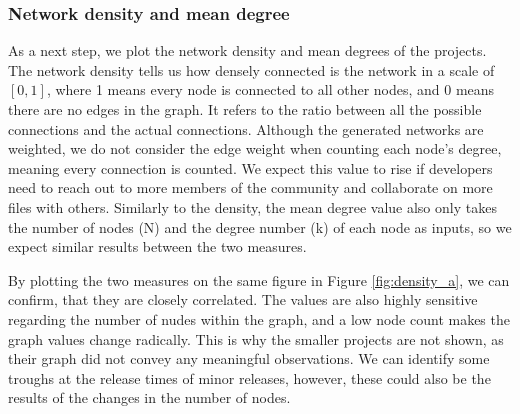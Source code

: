 \subsubsection{Network density and mean degree}
As a next step, we plot the network density and mean degrees of the projects. The network density tells us how densely connected is the network in a scale of $[0,1]$, where 1 means every node is connected to all other nodes, and 0 means there are no edges in the graph. It refers to the ratio between all the possible connections and the actual connections. Although the generated networks are weighted, we do not consider the edge weight when counting each node's degree, meaning every connection is counted. We expect this value to rise if developers need to reach out to more members of the community and collaborate on more files with others. Similarly to the density, the mean degree value also only takes the number of nodes (N) and the degree number (k) of each node as inputs, so we expect similar results between the two measures.

By plotting the two measures on the same figure in Figure \ref{fig:density_a}, we can confirm, that they are closely correlated. The values are also highly sensitive regarding the number of nudes within the graph, and a low node count makes the graph values change radically. This is why the smaller projects are not shown, as their graph did not convey any meaningful observations. We can identify some troughs at the release times of minor releases, however, these could also be the results of the changes in the number of nodes.

